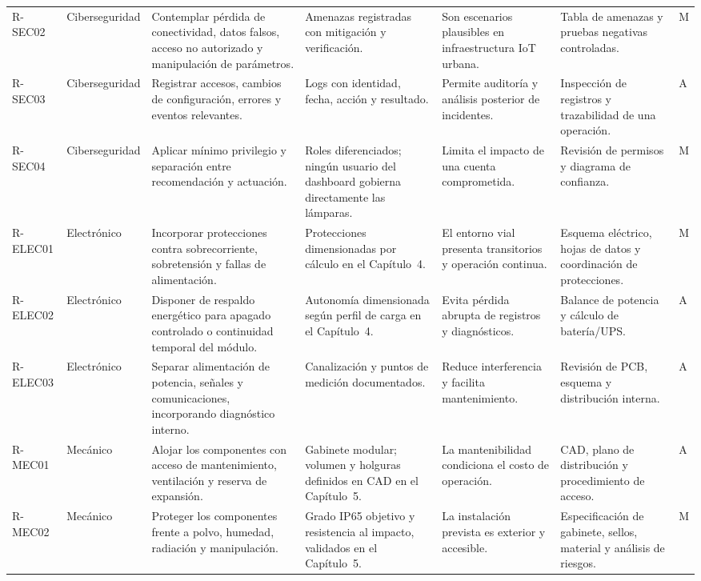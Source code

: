 \begin{landscape}
\begin{longtable}{@{}p{1.15cm}p{1.7cm}p{5.1cm}p{3.1cm}p{4.2cm}p{3.6cm}p{1.0cm}@{}}
R-SEC02 & Ciberseguridad & Contemplar pérdida de conectividad, datos falsos, acceso no autorizado y manipulación de parámetros. & Amenazas registradas con mitigación y verificación. & Son escenarios plausibles en infraestructura IoT urbana. & Tabla de amenazas y pruebas negativas controladas. & M\\
R-SEC03 & Ciberseguridad & Registrar accesos, cambios de configuración, errores y eventos relevantes. & Logs con identidad, fecha, acción y resultado. & Permite auditoría y análisis posterior de incidentes. & Inspección de registros y trazabilidad de una operación. & A\\
R-SEC04 & Ciberseguridad & Aplicar mínimo privilegio y separación entre recomendación y actuación. & Roles diferenciados; ningún usuario del dashboard gobierna directamente las lámparas. & Limita el impacto de una cuenta comprometida. & Revisión de permisos y diagrama de confianza. & M\\
R-ELEC01 & Electrónico & Incorporar protecciones contra sobrecorriente, sobretensión y fallas de alimentación. & Protecciones dimensionadas por cálculo en el Capítulo~4. & El entorno vial presenta transitorios y operación continua. & Esquema eléctrico, hojas de datos y coordinación de protecciones. & M\\
R-ELEC02 & Electrónico & Disponer de respaldo energético para apagado controlado o continuidad temporal del módulo. & Autonomía dimensionada según perfil de carga en el Capítulo~4. & Evita pérdida abrupta de registros y diagnósticos. & Balance de potencia y cálculo de batería/UPS. & A\\
R-ELEC03 & Electrónico & Separar alimentación de potencia, señales y comunicaciones, incorporando diagnóstico interno. & Canalización y puntos de medición documentados. & Reduce interferencia y facilita mantenimiento. & Revisión de PCB, esquema y distribución interna. & A\\
R-MEC01 & Mecánico & Alojar los componentes con acceso de mantenimiento, ventilación y reserva de expansión. & Gabinete modular; volumen y holguras definidos en CAD en el Capítulo~5. & La mantenibilidad condiciona el costo de operación. & CAD, plano de distribución y procedimiento de acceso. & A\\
R-MEC02 & Mecánico & Proteger los componentes frente a polvo, humedad, radiación y manipulación. & Grado IP65 objetivo y resistencia al impacto, validados en el Capítulo~5. & La instalación prevista es exterior y accesible. & Especificación de gabinete, sellos, material y análisis de riesgos. & M\\

\end{longtable}
\end{landscape}
